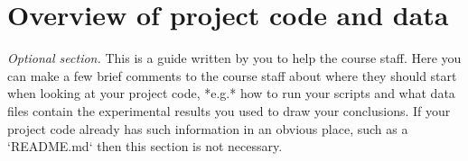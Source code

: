 \section{Overview of project code and data}

{\em Optional section.} This is a guide written by you to help the course staff.
Here you can make a few brief comments to the course staff about where
they should start when looking at your project code, *e.g.* how to run your scripts and what
data files contain the experimental results you used to draw your conclusions.
If your project code already has such information in an obvious place, such as a `README.md`
then this section is not necessary.
